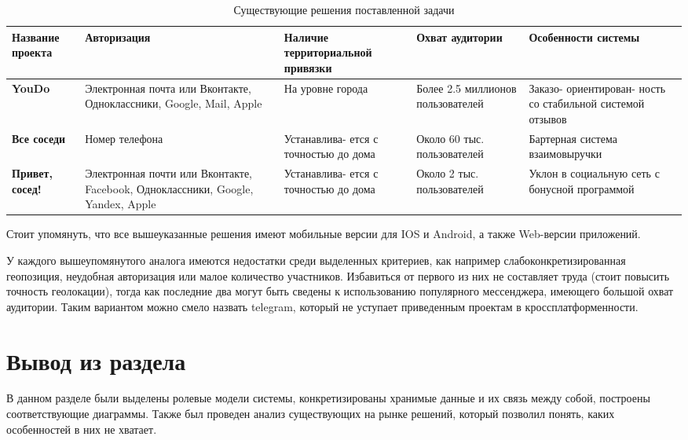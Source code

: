 \begin{table}[H]
	\centering
	\caption{Существующие решения поставленной задачи}
	\label{decisions}
	\begin{tabular}{|p{2.3cm}|p{3.3cm}|p{3cm}|p{3cm}|p{3.1cm}|}
		\hline
		\textbf{Название проекта} & \textbf{Авторизация} & \textbf{Наличие территориальной привязки} & \textbf{Охват аудитории} & \textbf{Особенности системы}\\
		\hline 
		\textbf{YouDo \cite{youdo}} & Электронная почта или Вконтакте, Одноклассники, Google, Mail, Apple & На уровне города & Более 2.5 миллионов пользователей & Заказо- ориентирован- ность со стабильной системой отзывов\\
		\hline
		\textbf{Все соседи \cite{all_neighbour}} & Номер телефона & Устанавлива- ется с точностью до дома & Около 60 тыс. пользователей & Бартерная система взаимовыручки\\
		\hline
		\textbf{Привет, сосед! \cite{hello_neighbour}} & Электронная почти или Вконтакте, Facebook, Одноклассники, Google, Yandex, Apple & Устанавлива- ется с точностью до дома & Около 2 тыс. пользователей & Уклон в социальную сеть с бонусной программой \\
		\hline
	\end{tabular}
\end{table}

Стоит упомянуть, что все вышеуказанные решения имеют мобильные версии для IOS и Android, а также Web-версии приложений.

У каждого вышеупомянутого аналога имеются недостатки среди выделенных критериев, как например слабоконкретизированная геопозиция, неудобная авторизация или малое количество участников. Избавиться от первого из них не составляет труда (стоит повысить точность геолокации), тогда как последние два могут быть сведены к использованию популярного мессенджера, имеющего большой охват аудитории. Таким вариантом можно смело назвать telegram, который не уступает приведенным проектам в кроссплатформенности.

\section{Вывод из раздела}

В данном разделе были выделены ролевые модели системы, конкретизированы хранимые данные и их связь между собой, построены соответствующие диаграммы. Также был проведен анализ существующих на рынке решений, который позволил понять, каких особенностей в них не хватает.